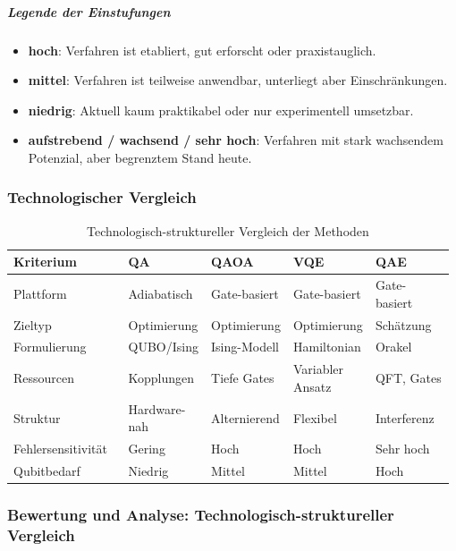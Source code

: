 \subparagraph{Legende der Einstufungen}

\begin{itemize}
    \item \textbf{hoch}: Verfahren ist etabliert, gut erforscht oder praxistauglich.
    \item \textbf{mittel}: Verfahren ist teilweise anwendbar, unterliegt aber Einschränkungen.
    \item \textbf{niedrig}: Aktuell kaum praktikabel oder nur experimentell umsetzbar.
    \item \textbf{aufstrebend / wachsend / sehr hoch}: Verfahren mit stark wachsendem Potenzial, aber begrenztem Stand heute.
\end{itemize}

\subsubsection*{Technologischer Vergleich}

\begin{table}[H]
\centering
\caption{Technologisch-struktureller Vergleich der Methoden}
\renewcommand{\arraystretch}{1.2}
\begin{tabular}{|p{0.26\linewidth}|p{0.18\linewidth}|p{0.18\linewidth}|p{0.18\linewidth}|p{0.18\linewidth}|}
\hline
\textbf{Kriterium} & \textbf{QA} & \textbf{QAOA} & \textbf{VQE} & \textbf{QAE} \\
\hline
Plattform & Adiabatisch & Gate-basiert & Gate-basiert & Gate-basiert \\
\hline
Zieltyp & Optimierung & Optimierung & Optimierung & Schätzung \\
\hline
Formulierung & QUBO/Ising & Ising-Modell & Hamiltonian & Orakel \\
\hline
Ressourcen & Kopplungen & Tiefe Gates & Variabler Ansatz & QFT, Gates \\
\hline
Struktur & Hardware-nah & Alternierend & Flexibel & Interferenz \\
\hline
Fehlersensitivität & Gering & Hoch & Hoch & Sehr hoch \\
\hline
Qubitbedarf & Niedrig & Mittel & Mittel & Hoch \\
\hline
\end{tabular}
\end{table}

\subsubsection*{Bewertung und Analyse: Technologisch-struktureller Vergleich}

